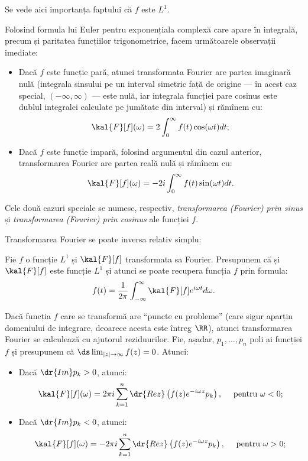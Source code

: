 
Se vede aici importanța faptului că $ f $ este $ L^1 $.

Folosind formula lui Euler pentru exponențiala complexă care apare în
integrală, precum și paritatea funcțiilor trigonometrice, facem următoarele
observații imediate:
\begin{itemize}
\item Dacă $ f $ este funcție pară, atunci transformata Fourier are partea
  imaginară nulă (integrala sinsului pe un interval simetric față de origine ---
  în acest caz special, $ (-\infty, \infty) $ --- este nulă, iar integrala
  funcției pare cosinus este dublul integralei calculate pe jumătate din
  interval) și rămînem cu:
  \[
    \kal{F}[f](\omega) = 2 \int_0^\infty f(t)\cos(\omega t) dt;
  \]
\item Dacă $ f $ este funcție impară, folosind argumentul din cazul anterior,
  transformarea Fourier are partea reală nulă și rămînem cu:
  \[
    \kal{F}[f](\omega) = -2i \int_0^\infty f(t) \sin (\omega t) dt.
  \]
\end{itemize}

Cele două cazuri speciale se numesc, respectiv, \emph{transformarea (Fourier) prin sinus}
și \emph{transformarea (Fourier) prin cosinus} ale funcției $ f $.

Transformarea Fourier se poate inversa relativ simplu:
\begin{theorem}\label{thm:fourier-inv}
  Fie $ f $ o funcție $ L^1 $ și $ \kal{F}[f] $ transformata sa Fourier.
  Presupunem că și $ \kal{F}[f] $ este funcție $ L^1 $ și atunci
  se poate recupera funcția $ f $ prin formula:
  \[
    f(t) = \dfrac{1}{2 \pi} \int_{-\infty}^\infty \kal{F}[f]e^{i\omega t}d\omega.
  \]
\end{theorem}

Dacă funcția $ f $ care se transformă are \enquote{puncte cu probleme}
(care sigur aparțin domeniului de integrare, deoarece acesta este întreg
$ \RR $), atunci transformarea Fourier se calculează cu ajutorul reziduurilor.
Fie, așadar, $ p_1, \dots, p_n $ poli ai funcției $ f $ și presupunem că
$ \ds\lim_{|z| \to \infty} f(z) = 0 $. Atunci:
\begin{itemize}
\item Dacă $ \dr{Im}p_k > 0 $, atunci:
  \[
    \kal{F}[f](\omega) = 2\pi i \sum_{k=1}^n \dr{Rez}\left(f(z)e^{-i\omega z} p_k\right), %
    \quad \text{ pentru } \omega < 0;
  \]
\item Dacă $ \dr{Im}p_k < 0 $, atunci:
  \[
    \kal{F}[f](\omega) = -2\pi i \sum_{k=1}^n \dr{Rez}\left(f(z)e^{-i\omega z} p_k\right), %
    \quad \text{ pentru } \omega > 0;
  \]
\end{itemize}

